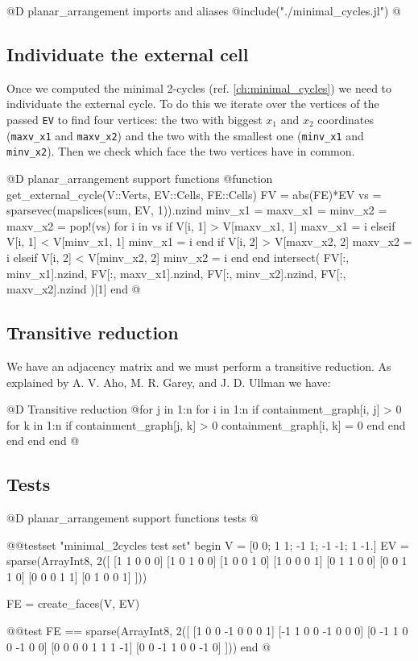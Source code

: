 \documentclass[10pt]{book}
\begin{document}
@D planar\_arrangement imports and aliases
@{include("./minimal_cycles.jl")
@}

\subsection{Individuate the external cell}
Once we computed the minimal 2-cycles (ref. \ref{ch:minimal_cycles})
we need to individuate the external cycle. To do this we iterate over the
vertices of the passed \texttt{EV} to find four vertices: the two with biggest
$x_1$ and $x_2$ coordinates (\texttt{maxv\_x1} and \texttt{maxv\_x2}) and the 
two with the smallest one (\texttt{minv\_x1} and \texttt{minv\_x2}). 
Then we check which face the two vertices have in common.

@D planar\_arrangement support functions
@{function get_external_cycle(V::Verts, EV::Cells, FE::Cells)
    FV = abs(FE)*EV
    vs = sparsevec(mapslices(sum, EV, 1)).nzind
    minv_x1 = maxv_x1 = minv_x2 = maxv_x2 = pop!(vs)
    for i in vs
        if V[i, 1] > V[maxv_x1, 1]
            maxv_x1 = i
        elseif V[i, 1] < V[minv_x1, 1]
            minv_x1 = i
        end
        if V[i, 2] > V[maxv_x2, 2]
            maxv_x2 = i
        elseif V[i, 2] < V[minv_x2, 2]
            minv_x2 = i
        end
    end
    intersect(
        FV[:, minv_x1].nzind, 
        FV[:, maxv_x1].nzind,
        FV[:, minv_x2].nzind,
        FV[:, maxv_x2].nzind
    )[1]
end
@}

\subsection{Transitive reduction}

We have an adjacency matrix and we must perform a transitive reduction.
As explained by A. V. Aho, M. R. Garey, and J. D. Ullman \cite{parallel_transitive_reduction}
we have:

@D Transitive reduction
@{for j in 1:n
    for i in 1:n
        if containment_graph[i, j] > 0
            for k in 1:n
                if containment_graph[j, k] > 0
                    containment_graph[i, k] = 0
                end
            end
        end
    end
end
@}


\subsection{Tests}
@D planar\_arrangement support functions tests
@{@@testset "minimal_2cycles test set" begin
    V = [0 0; 1 1; -1 1; -1 -1; 1 -1.]
    EV = sparse(Array{Int8, 2}([
        [1 1 0 0 0]
        [1 0 1 0 0]
        [1 0 0 1 0]
        [1 0 0 0 1]
        [0 1 1 0 0]
        [0 0 1 1 0]
        [0 0 0 1 1]
        [0 1 0 0 1]
    ]))

    FE = create_faces(V, EV)
    
    @@test FE == sparse(Array{Int8, 2}([
        [1 0 0 -1 0 0 0 1] 
        [-1 1 0 0 -1 0 0 0]
        [0 -1 1 0 0 -1 0 0]
        [0 0 0 0 1 1 1 -1]
        [0 0 -1 1 0 0 -1 0]
    ]))
end
@}
\end{document}

